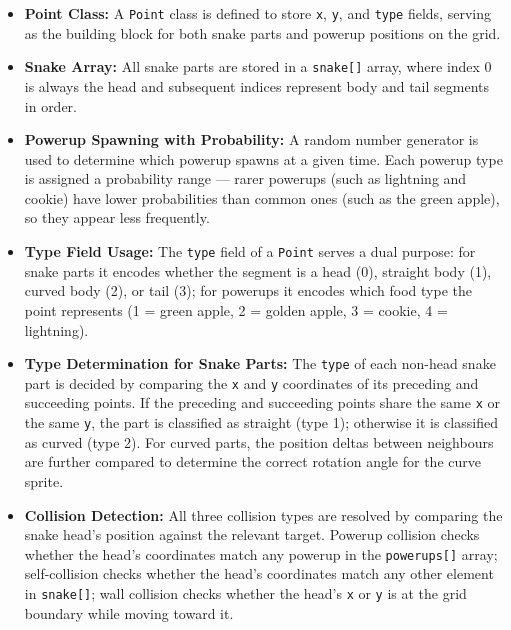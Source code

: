 \documentclass[12pt,a4paper]{article}
\begin{document}
\begin{itemize}
    \item \textbf{Point Class:} A \texttt{Point} class is defined to store \texttt{x}, \texttt{y}, and \texttt{type} fields, serving as the building block for both snake parts and powerup positions on the grid.

    \item \textbf{Snake Array:} All snake parts are stored in a \texttt{snake[]} array, where index 0 is always the head and subsequent indices represent body and tail segments in order.

    \item \textbf{Powerup Spawning with Probability:} A random number generator is used to determine which powerup spawns at a given time. Each powerup type is assigned a probability range --- rarer powerups (such as lightning and cookie) have lower probabilities than common ones (such as the green apple), so they appear less frequently.

    \item \textbf{Type Field Usage:} The \texttt{type} field of a \texttt{Point} serves a dual purpose: for snake parts it encodes whether the segment is a head (0), straight body (1), curved body (2), or tail (3); for powerups it encodes which food type the point represents (1 = green apple, 2 = golden apple, 3 = cookie, 4 = lightning).

    \item \textbf{Type Determination for Snake Parts:} The \texttt{type} of each non-head snake part is decided by comparing the \texttt{x} and \texttt{y} coordinates of its preceding and succeeding points. If the preceding and succeeding points share the same \texttt{x} or the same \texttt{y}, the part is classified as straight (type 1); otherwise it is classified as curved (type 2). For curved parts, the position deltas between neighbours are further compared to determine the correct rotation angle for the curve sprite.

    \item \textbf{Collision Detection:} All three collision types are resolved by comparing the snake head's position against the relevant target. Powerup collision checks whether the head's coordinates match any powerup in the \texttt{powerups[]} array; self-collision checks whether the head's coordinates match any other element in \texttt{snake[]}; wall collision checks whether the head's \texttt{x} or \texttt{y} is at the grid boundary while moving toward it.
\end{itemize}
\end{document}
